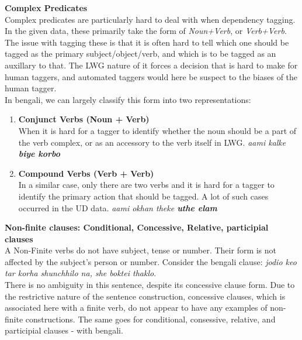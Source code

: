 \documentclass[a4 paper]{article}
\begin{document}
 \textbf{Complex Predicates}\\
Complex predicates are particularly hard to deal with when dependency tagging.
In the given data, these primarily take the form of \textit{Noun+Verb}, or
\textit{Verb+Verb}. The issue with tagging these is that it is often hard to
tell which one should be tagged as the primary subject/object/verb, and which
is to be tagged as an auxillary to that. The LWG nature of it forces a decision
that is hard to make for human taggers, and automated taggers would here be
suspect to the biases of the human tagger.\\
In bengali, we can largely classify this form into two representations:
\begin{enumerate}
    \item \textbf{Conjunct Verbs (Noun + Verb)}\\
        When it is hard for a tagger to identify whether the noun should be a part
        of the verb complex, or as an accessory to the verb itself in LWG.
        \addlinespace[1em]
        \textit{aami kalke \textbf{biye korbo}}
    \item \textbf{Compound Verbs (Verb + Verb)}\\
        In a similar case, only there are two verbs and it is hard for a tagger
        to identify the primary action that should be tagged. A lot of such
        cases occurred in the UD data.
        \addlinespace[1em]
        \textit{aami okhan theke \textbf{uthe elam}}
\end{enumerate}

 \textbf{Non-finite clauses: Conditional, Concessive, Relative, participial clauses}\\
A Non-Finite verbs do not have subject, tense or number. Their form is not
affected by the subject's person or number.
\addlinespace[1em]
Consider the bengali clause: \textit{jodio keo tar korha shunchhilo na, she
boktei thaklo}.\\
There is no ambiguity in this sentence, despite its concessive clause form. Due
to the restrictive nature of the sentence construction, concessive clauses,
which is associated here with a finite verb, do not appear to have any examples
of non-finite constructions. The same goes for conditional, consessive, relative,
and participial clauses - with bengali.
\end{document}
